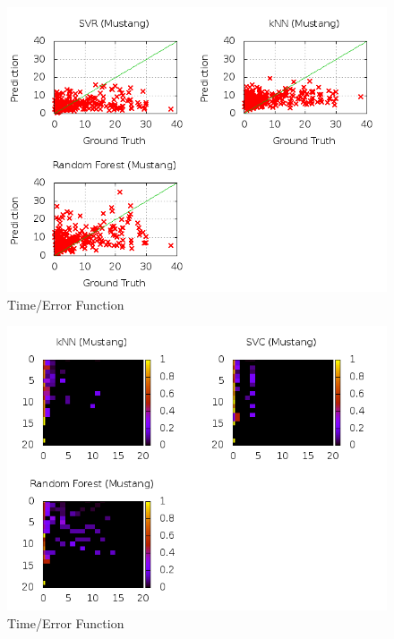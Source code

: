 \begin{figure}
\centering
\includegraphics[scale=0.55]{images/plots/machine_learning/mustang/true_pred_mustang.png}
\caption{Time/Error Function}
\label{crowdsourcing_desc_length}
\end{figure}
\begin{figure}
\centering
\includegraphics[scale=0.55]{images/plots/machine_learning/mustang/conf_mat_mustang.png}
\caption{Time/Error Function}
\label{crowdsourcing_desc_length}
\end{figure}
